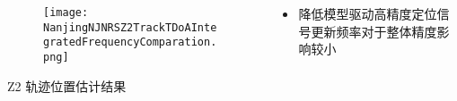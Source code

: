 \begin{frame}
\begin{columns}[t]
\begin{column}{0.5\textwidth}
\begin{columns}[t]
\begin{column}{0.3\textwidth}
					   	\begin{figure}
					   	\centering
					   	    \texttt{[image: NanjingNJNRSZ2TrackTDoAIntegratedFrequencyComparation.png]}
					   	\end{figure}
					   	\vspace{-0.5cm}
		   			   	\hspace{0.0cm} {\tiny Z2 轨迹位置估计结果}
					\end{column}
					\begin{column}{0.4\textwidth}
					    \vspace{1cm}
						{\small 						
							\begin{itemize}
								\item 降低模型驱动高精度定位信号更新频率对于整体精度影响较小
							\end{itemize}
						}
					\end{column}
				\end{columns}
		\end{column}
	\end{columns}
\end{frame}

